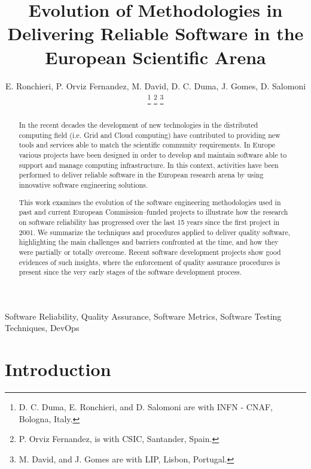 \documentclass[journal]{IEEEtran}
\begin{document}
\title{Evolution of Methodologies in Delivering Reliable Software in the European Scientific Arena}

\author{E. Ronchieri,
        P. Orviz Fernandez,
        M. David,
        D. C. Duma,
        J. Gomes,
        D. Salomoni
\thanks{D. C. Duma, E. Ronchieri, and D. Salomoni are with INFN - CNAF, Bologna, Italy.}
\thanks{P. Orviz Fernandez, is with CSIC, Santander, Spain.}
\thanks{M. David, and J. Gomes are with LIP, Lisbon, Portugal.}%
}

\maketitle

\begin{abstract}

In the recent decades the development of new technologies in the distributed computing field (i.e. Grid and Cloud computing) have contributed to
providing new tools and services able to match the scientific community requirements. In Europe various projects have been designed in order to develop and maintain software able to support and manage computing infrastructure. In this context, activities have been performed to deliver reliable software in the European research arena by using innovative software engineering solutions.

This work examines the evolution of the software engineering methodologies used in past and
current European Commission--funded projects to illustrate how the research on software
reliability has progressed over the last 15 years since the
first project in 2001. We summarize the techniques and procedures
applied to deliver quality software, highlighting the main challenges and barriers confronted
at the time, and how they were partially or totally overcome. 
Recent software development projects show good evidences of such insights, where the enforcement of quality assurance
procedures is present since the very early stages of the software development process.

\end{abstract}

\begin{IEEEkeywords}
Software Reliability, Quality Assurance, Software Metrics, Software Testing
Techniques, DevOps
\end{IEEEkeywords}

\IEEEpeerreviewmaketitle
\section{Introduction}
\end{document}
